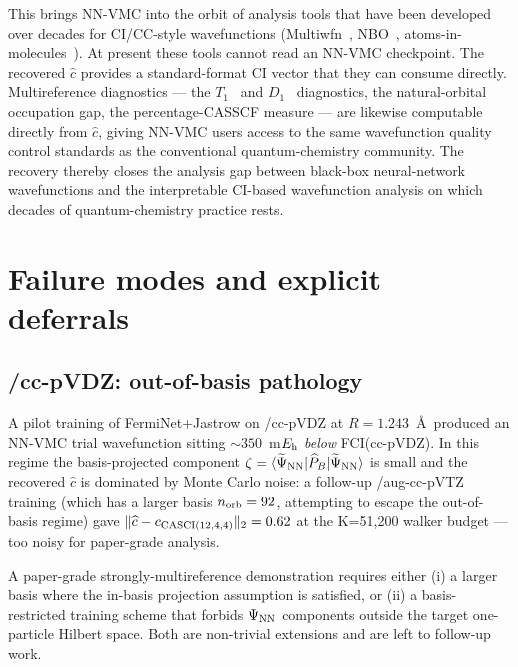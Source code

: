 \documentclass[journal=jctcce,manuscript=suppinfo,layout=traditional]{achemso}
\begin{document}
This brings NN-VMC into the orbit of analysis tools that have been
developed over decades for CI/CC-style wavefunctions
(Multiwfn~\cite{Lu2012Multiwfn}, NBO~\cite{Glendening2013NBO},
atoms-in-molecules~\cite{Bader1990AIM}). At present these tools
cannot read an NN-VMC checkpoint. The recovered $\widehat{c}$
provides a standard-format CI vector that they can consume directly.
Multireference diagnostics --- the $T_1$~\cite{Lee1989T1diag} and
$D_1$~\cite{Janssen1998D1diag} diagnostics, the natural-orbital
occupation gap, the percentage-CASSCF measure --- are likewise
computable directly from $\widehat{c}$, giving NN-VMC users access to the same wavefunction
quality control standards as the conventional quantum-chemistry
community. The recovery thereby closes the analysis gap between
black-box neural-network wavefunctions and the interpretable
CI-based wavefunction analysis on which decades of quantum-chemistry
practice rests.

\section{Failure modes and explicit deferrals}
\label{sec:supp_failures}

\subsection{/cc-pVDZ: out-of-basis pathology}

A pilot training of FermiNet+Jastrow on /cc-pVDZ at
$R=1.243$~\AA\ produced an NN-VMC trial wavefunction sitting
$\sim 350$~m$E_{\rm h}$ \emph{below} FCI(cc-pVDZ). In this regime the
basis-projected component
$\zeta = \langle \widetilde\Psi_{\rm NN} | \widehat P_B |
\widetilde\Psi_{\rm NN}\rangle$ is small and the recovered
$\widehat c$ is dominated by Monte Carlo noise: a follow-up
/aug-cc-pVTZ training (which has a larger basis $n_{\rm orb}=92$,
attempting to escape the out-of-basis regime) gave
$\| \widehat c - c_{\rm CASCI(12,4,4)} \|_2 = 0.62$ at the K=51{,}200
walker budget --- too noisy for paper-grade analysis.

A paper-grade strongly-multireference demonstration requires either
(i) a larger basis where the in-basis projection assumption is
satisfied, or (ii) a basis-restricted training scheme that forbids
$\Psi_{\rm NN}$ components outside the target one-particle Hilbert
space. Both are non-trivial extensions and are left to follow-up
work.
\end{document}
